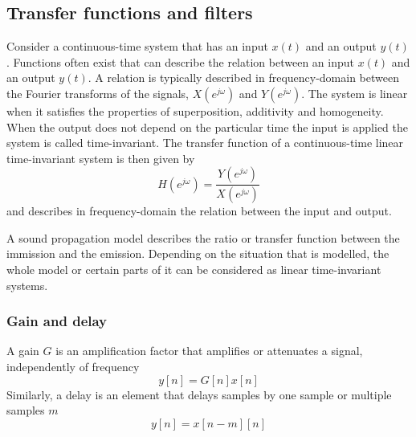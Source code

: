 

\subsection{Transfer functions and filters}
Consider a continuous-time system that has an input $x(t)$ and an output $y(t)$. Functions often
exist that can describe the relation between an input $x(t)$ and an output
$y(t)$. A relation is typically described in frequency-domain between the
Fourier transforms of the signals, $X(e^{j\omega})$ and $Y(e^{j\omega})$.
The system is linear when it satisfies the properties of superposition,
additivity and homogeneity. When the output does not depend on the particular
time the input is applied the system is called time-invariant.
The transfer function of a continuous-time linear time-invariant system is then given by
\begin{equation}
  H(e^{j\omega}) = \frac{Y(e^{j\omega})}{X(e^{j\omega})}
\end{equation}
and describes in frequency-domain the relation between the input and output.

A sound propagation model describes the ratio or transfer function between the
immission and the emission. Depending on the situation that is modelled, the
whole model or certain parts of it can be considered as linear time-invariant
systems.


%
%

\subsubsection{Gain and delay}
A gain $G$ is an amplification factor that amplifies or attenuates a signal, independently of frequency
\begin{equation}
  y[n] = G[n] x[n]
\end{equation}
Similarly, a delay is an element that delays samples by one sample or multiple samples $m$
\begin{equation}
  y[n] = x[n-m][n]
\end{equation}

